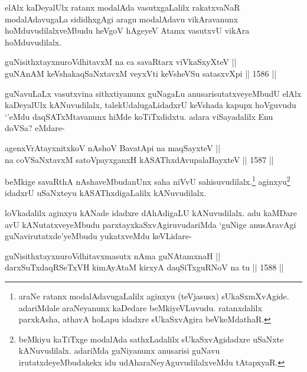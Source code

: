 \begin{artha}
elAlx kaDeyalUlx ratanx modalAda vasutxgaLalilx rakatxvaNaR modalAdavugaLa sididhxgAgi aragu modalAdavu vikAravanunx hoMduvudilalxveMbudu heVgoV hAgeyeV Atamx vasutxvU vikAra hoMduvudilalx.
\end{artha}


\begin{shl}
guNisithxtayxnuroVdhitavxM na ca savaRtarx viVkaSxyXteV || \\
guNAnAM keVshakaqSaNxtavxM veyxVti keVsheVSu satasxvXpi \hfill || 1586 ||  
\end{shl}

\begin{artha}
guNavuLaLx vasutxvina sithxtiyanunx guNagaLu anusarisutatxveyeMbudU elAlx kaDeyalUlx kANuvudilalx, talekUdalugaLidadxrU keVshada kapupx hoVguvudu `\stext'eMdu daqSATxMtavanunx hiMde koTiTxdidxtu. adara viSayadalilx Enu doVSa? eMdare-
\end{artha}

\begin{shl}
agenxVrAtayxnitxkoV nAshoV BavatA\s pi na maqSayxteV || \\
na coVSaNxtavxM satoV\s payxganxH kASAThxdAvupalaBayxteV \hfill || 1587 ||  
\end{shl}

\begin{artha}
beMkige savaRthA nAshaveMbudanUnx saha niVvU sahisuvudilalx.\footnote{araNe ratanx modalAdavugaLalilx aginxyu (teVjasusx) sUkaSxmXvAgide. adariMdale araNeyanunx kaDedare beMkiyeVLuvudu. ratanxdalilx parxkAsha, athavA hoLapu idadxre sUkaSxvAgira beVkeMdathaR.} aginxyu\footnote{beMkiyu kaTiTxge modalAda sathxLadalilx sUkaSxvAgidadxre uSaNxte kANuvudilalx. adariMda guNiyanunx anusarisi guNavu irutatxdeyeMbudakekx idu udAharaNeyAguvudilalxveMdu tAtapxyaR.} idadxrU uSaNxteyu kASAThxdigaLalilx kANuvudilalx.
\end{artha}

\begin{artha}
loVkadalilx aginxyu kANade idadxre dAhAdigaLU kANuvudilalx. adu kaMDare avU kANutatxveyeMbudu parxtayxkaSxvAgiruvudariMda `guNige anusAravAgi guNavirutatxde'yeMbudu yukatxveMdu keVLidare-
\end{artha}

\begin{shl}
guNisithxtayxnuroVdhitavxmasutx nAma guNAtamxnaH || \\
darxSuTxdaqRSeTxVH kimAyAtaM kirxyA daqSiTxguRNoV na tu \hfill || 1588 ||  
\end{shl}

